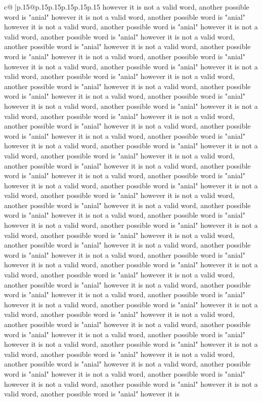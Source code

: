 \documentclass{article}
\begin{document}
{\begin{supertabular}{c@{$\;$}|p{.15\linewidth}@{}p{.15\linewidth}p{.15\linewidth}p{.15\linewidth}p{.15\linewidth}p{.15\linewidth}}
{{{however it is not a valid word, another possible word is "anial" however it is not a valid word, another possible word is "anial" however it is not a valid word, another possible word is "anial" however it is not a valid word, another possible word is "anial" however it is not a valid word, another possible word is "anial" however it is not a valid word, another possible word is "anial" however it is not a valid word, another possible word is "anial" however it is not a valid word, another possible word is "anial" however it is not a valid word, another possible word is "anial" however it is not a valid word, another possible word is "anial" however it is not a valid word, another possible word is "anial" however it is not a valid word, another possible word is "anial" however it is not a valid word, another possible word is "anial" however it is not a valid word, another possible word is "anial" however it is not a valid word, another possible word is "anial" however it is not a valid word, another possible word is "anial" however it is not a valid word, another possible word is "anial" however it is not a valid word, another possible word is "anial" however it is not a valid word, another possible word is "anial" however it is not a valid word, another possible word is "anial" however it is not a valid word, another possible word is "anial" however it is not a valid word, another possible word is "anial" however it is not a valid word, another possible word is "anial" however it is not a valid word, another possible word is "anial" however it is not a valid word, another possible word is "anial" however it is not a valid word, another possible word is "anial" however it is not a valid word, another possible word is "anial" however it is not a valid word, another possible word is "anial" however it is not a valid word, another possible word is "anial" however it is not a valid word, another possible word is "anial" however it is not a valid word, another possible word is "anial" however it is not a valid word, another possible word is "anial" however it is not a valid word, another possible word is "anial" however it is not a valid word, another possible word is "anial" however it is not a valid word, another possible word is "anial" however it is not a valid word, another possible word is "anial" however it is not a valid word, another possible word is "anial" however it is not a valid word, another possible word is "anial" however it is not a valid word, another possible word is "anial" however it is not a valid word, another possible word is "anial" however it is not a valid word, another possible word is "anial" however it is not a valid word, another possible word is "anial" however it is not a valid word, another possible word is "anial" however it is not a valid word, another possible word is "anial" however it is not a valid word, another possible word is "anial" however it is not a valid word, another possible word is "anial" however it is not a valid word, another possible word is "anial" however it is not a valid word, another possible word is "anial" however it is not a valid word, another possible word is "anial" however it is }}}
\end{supertabular}}
\end{document}

